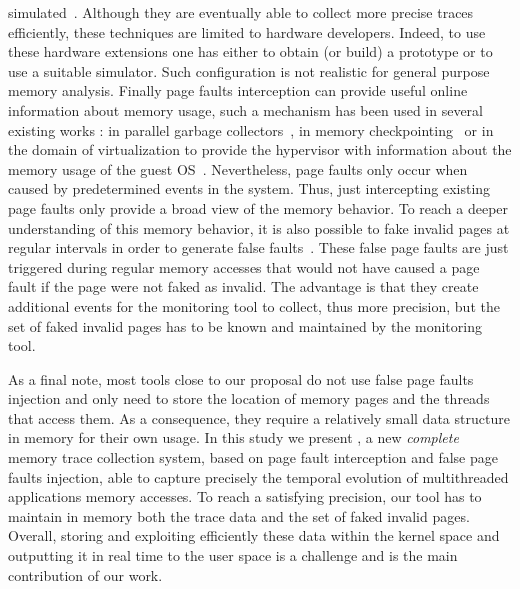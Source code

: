 simulated~\cite{Bao08HMTT,Martonosi92MemSpy}.  Although they are eventually
able to collect more precise traces efficiently, these techniques are limited
to hardware developers. Indeed, to use these hardware extensions one has
either to obtain (or build) a prototype or to use a suitable simulator. Such
configuration is not realistic for general purpose memory analysis.
%
Finally  page faults interception can provide useful online information about
memory usage, such a mechanism has been used in several existing works : in
parallel garbage collectors~\cite{Boehm91Mostly}, in memory
checkpointing~\cite{Heo05Spaceefficient} or in the domain of virtualization to
provide the hypervisor with information about the memory usage of the guest
OS~\cite{Jones06Geiger}. Nevertheless, page faults only occur when caused by
predetermined events in the system. Thus, just intercepting existing page
faults only provide a broad view of the memory behavior. To reach a deeper
understanding of this memory behavior, it is also possible to fake invalid
pages at regular intervals in order to generate false
faults~\cite{Bae12Dynamic,Diener13CommunicationBased}.  These false page
faults are just triggered during regular memory accesses that would not have
caused a page fault if the page were not faked as invalid. The advantage is
that they create additional events for the monitoring tool to collect, thus
more precision, but the set of faked invalid pages has to be known and
maintained by the monitoring tool.

As a final note, most tools close to our proposal do not use false page faults injection and only need to store the location of memory pages and the threads that access them.
As a consequence, they require a relatively small data structure in memory for their own usage.
In this study we present \Moca, a new \emph{complete} memory trace collection system, based on page
fault interception and false page faults injection, able to capture precisely the temporal evolution of multithreaded applications memory accesses.
To reach a satisfying precision, our tool has to maintain in memory both the trace data and
the set of faked invalid pages. Overall, storing and exploiting efficiently these data within the kernel space and outputting it in real time to the user space
is a challenge and is the main contribution of our work.
